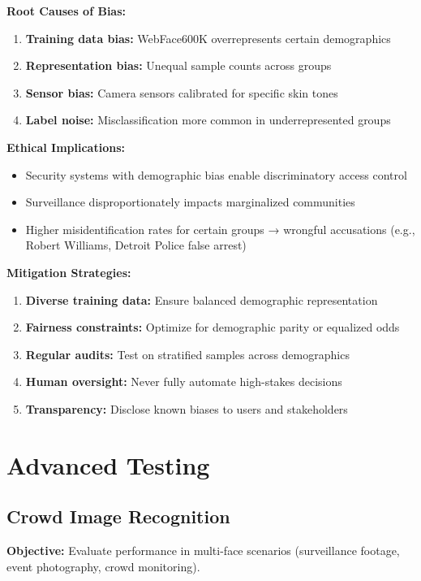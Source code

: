 \documentclass[11pt,a4paper]{article}
\begin{document}
\textbf{Root Causes of Bias:}
\begin{enumerate}
    \item \textbf{Training data bias:} WebFace600K overrepresents certain demographics
    \item \textbf{Representation bias:} Unequal sample counts across groups
    \item \textbf{Sensor bias:} Camera sensors calibrated for specific skin tones
    \item \textbf{Label noise:} Misclassification more common in underrepresented groups
\end{enumerate}

\textbf{Ethical Implications:}
\begin{itemize}
    \item Security systems with demographic bias enable discriminatory access control
    \item Surveillance disproportionately impacts marginalized communities
    \item Higher misidentification rates for certain groups → wrongful accusations (e.g., Robert Williams, Detroit Police false arrest)
\end{itemize}

\textbf{Mitigation Strategies:}
\begin{enumerate}
    \item \textbf{Diverse training data:} Ensure balanced demographic representation
    \item \textbf{Fairness constraints:} Optimize for demographic parity or equalized odds
    \item \textbf{Regular audits:} Test on stratified samples across demographics
    \item \textbf{Human oversight:} Never fully automate high-stakes decisions
    \item \textbf{Transparency:} Disclose known biases to users and stakeholders
\end{enumerate}

\section{Advanced Testing}

\subsection{Crowd Image Recognition}

\textbf{Objective:} Evaluate performance in multi-face scenarios (surveillance footage, event photography, crowd monitoring).
\end{document}
